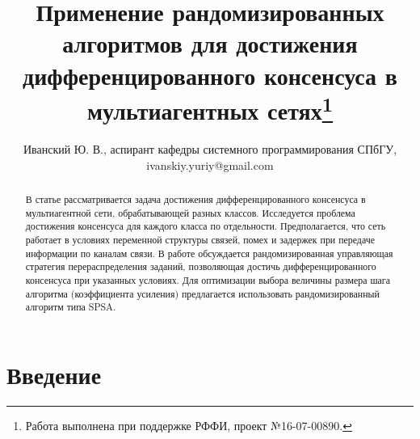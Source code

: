 \documentclass{spisok-article}
\title{Применение рандомизированных алгоритмов для достижения дифференцированного консенсуса в мультиагентных сетях\thanks{Работа выполнена при поддержке РФФИ, проект №16-07-00890.}
}
\author{
  Иванский Ю. В.,
  аспирант кафедры системного программирования СПбГУ,
  ivanskiy.yuriy@gmail.com
}
\begin{document}
\maketitle

\begin{abstract}
В статье рассматривается задача достижения дифференцированного консенсуса в мультиагентной сети, обрабатывающей разных классов. Исследуется проблема достижения консенсуса  для каждого класса по отдельности. Предполагается, что сеть работает в условиях переменной структуры связей, помех и задержек при передаче информации по каналам связи. В работе обсуждается рандомизированная управляющая стратегия  перераспределения заданий, позволяющая достичь дифференцированного консенсуса при указанных условиях. Для оптимизации выбора величины размера шага алгоритма (коэффициента усиления) предлагается использовать рандомизированный алгоритм типа SPSA. 
\end{abstract}

\section{Введение}


\end{document}
